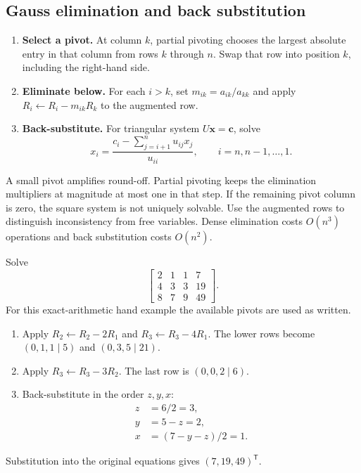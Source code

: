 \documentclass[12pt,a4paper]{article}
\begin{document}
\subsection{Gauss elimination and back substitution}
\begin{enumerate}[leftmargin=*, itemsep=3pt, topsep=4pt]
  \item \textbf{Select a pivot.} At column $k$, partial pivoting chooses the largest absolute entry in that column from rows $k$ through $n$. Swap that row into position $k$, including the right-hand side.
  \item \textbf{Eliminate below.} For each $i>k$, set $m_{ik}=a_{ik}/a_{kk}$ and apply $R_i\leftarrow R_i-m_{ik}R_k$ to the augmented row.
  \item \textbf{Back-substitute.} For triangular system $U\mathbf{x}=\mathbf{c}$, solve
 \[
 x_i=\frac{c_i-\sum_{j=i+1}^n u_{ij}x_j}{u_{ii}},
 \qquad i=n,n-1,\ldots,1.
 \]
\end{enumerate}
A small pivot amplifies round-off. Partial pivoting keeps the elimination multipliers at magnitude at most one in that step. If the remaining pivot column is zero, the square system is not uniquely solvable. Use the augmented rows to distinguish inconsistency from free variables. Dense elimination costs $O(n^3)$ operations and back substitution costs $O(n^2)$.

\begin{tcolorbox}[examplebox, title={Gauss elimination with every row operation shown}]
Solve
\[
\left[\begin{array}{rrr|r}
2&1&1&7\\
4&3&3&19\\
8&7&9&49
\end{array}\right].
\]
For this exact-arithmetic hand example the available pivots are used as written.
\begin{enumerate}[leftmargin=*, itemsep=3pt, topsep=4pt]
  \item Apply $R_2\leftarrow R_2-2R_1$ and $R_3\leftarrow R_3-4R_1$. The lower rows become $(0,1,1\mid5)$ and $(0,3,5\mid21)$.
  \item Apply $R_3\leftarrow R_3-3R_2$. The last row is $(0,0,2\mid6)$.
  \item Back-substitute in the order $z,y,x$:
 \[
 \begin{aligned}
  z&=6/2=3,\\
  y&=5-z=2,\\
  x&=(7-y-z)/2=1.
 \end{aligned}
 \]
\end{enumerate}
Substitution into the original equations gives $(7,19,49)^{\mathsf T}$.
\end{tcolorbox}
\end{document}
